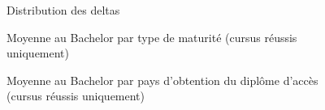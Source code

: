 \begin{figure}[H]
\caption{Distribution des deltas}
\label{fig:deltas}
\end{figure}

\begin{figure}[H]
\caption{Moyenne au Bachelor par type de maturité (cursus réussis uniquement)}
\label{fig:matu}
\end{figure}

\begin{figure}[H]
\caption{Moyenne au Bachelor par pays d'obtention du diplôme d'accès (cursus réussis uniquement)}
\label{fig:pays}
\end{figure}


